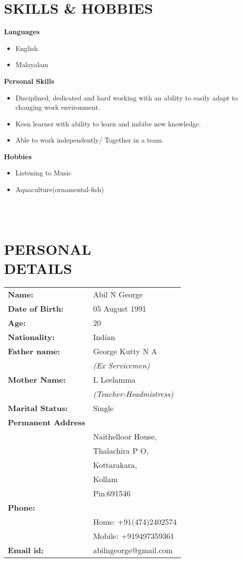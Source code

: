 \documentclass[line,margin]{res}
\begin{document}
\begin{resume}
    \section{SKILLS \& HOBBIES}
        {\bf Languages}
        \begin{itemize} \itemsep -2pt
        \item English
        \item Malayalam
        \end{itemize}
        {\bf Personal Skills}
        \begin{itemize} \itemsep -2pt
        \item Disciplined, dedicated and hard working with an ability to easily adapt to changing work environment.
        \item Keen learner with ability to learn and imbibe new knowledge.
        \item Able to work independently/ Together in a team.
        \end{itemize}
        {\bf Hobbies}
        \begin{itemize} \itemsep -2pt
        \item Listening to Music
        \item Aquaculture(ornamental-fish)
        \end{itemize}\\\\
                
                          
    \section{PERSONAL \\ DETAILS}
    \begin{tabular}{ l l }
      {\bf Name:} &Abil N George\\
      {\bf Date of Birth:}&05 August 1991\\
      {\bf Age:} &20\\
      {\bf Nationality:}&Indian\\
      {\bf Father name:}&George Kutty N A \\
      &{\it (Ex Servicemen)}\\
      {\bf Mother Name:}&L Leelamma \\
      &{\it (Teacher-Headmistress)}\\
      {\bf Marital Status:} &Single\\
      {\bf Permanent Address}& \\
      &Naithelloor House,\\
      &Thalachira P O,\\
      &Kottarakara,\\
      &Kollam\\
      &Pin:691546\\
      {\bf Phone:}&\\
      &Home: +91(474)2402574\\
      &Mobile: +919497359361\\
      {\bf Email id:} &abilngeorge@gmail.com\\
    \end{tabular}
\end{resume}
\end{document}

